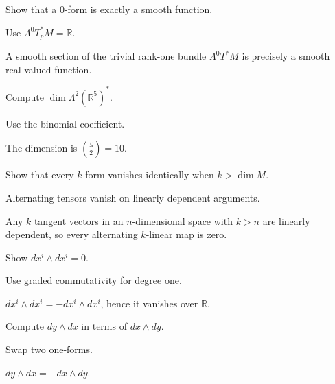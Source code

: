 \begin{exercise}\label{exr:vii09-01}
Show that a \(0\)-form is exactly a smooth function.
\end{exercise}
\begin{hint}
Use \(\Lambda^0T_p^*M=\mathbb R\).
\end{hint}
\begin{solution}
A smooth section of the trivial rank-one bundle \(\Lambda^0T^*M\) is precisely a smooth real-valued function.
\end{solution}

\begin{exercise}\label{exr:vii09-02}
Compute \(\dim\Lambda^2(\mathbb R^5)^*\).
\end{exercise}
\begin{hint}
Use the binomial coefficient.
\end{hint}
\begin{solution}
The dimension is \(\binom52=10\).
\end{solution}

\begin{exercise}\label{exr:vii09-03}
Show that every \(k\)-form vanishes identically when \(k>\dim M\).
\end{exercise}
\begin{hint}
Alternating tensors vanish on linearly dependent arguments.
\end{hint}
\begin{solution}
Any \(k\) tangent vectors in an \(n\)-dimensional space with \(k>n\) are linearly dependent, so every alternating \(k\)-linear map is zero.
\end{solution}

\begin{exercise}\label{exr:vii09-04}
Show \(dx^i\wedge dx^i=0\).
\end{exercise}
\begin{hint}
Use graded commutativity for degree one.
\end{hint}
\begin{solution}
\(dx^i\wedge dx^i=-dx^i\wedge dx^i\), hence it vanishes over \(\mathbb R\).
\end{solution}

\begin{exercise}\label{exr:vii09-05}
Compute \(dy\wedge dx\) in terms of \(dx\wedge dy\).
\end{exercise}
\begin{hint}
Swap two one-forms.
\end{hint}
\begin{solution}
\(dy\wedge dx=-dx\wedge dy\).
\end{solution}

